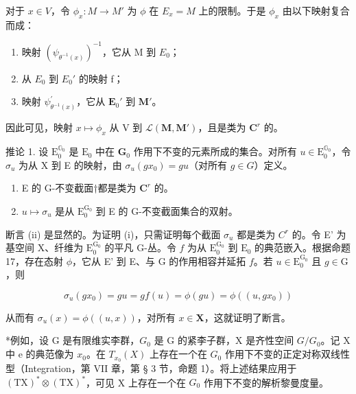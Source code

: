 对于 \(x \in V\)，令 \(\phi_x: M \to M'\) 为 \(\phi\) 在 \(E_x = M\) 上的限制。于是 \(\phi_x\) 由以下映射复合而成：

\begin{enumerate}
\def\labelenumi{(\arabic{enumi})}
\item
  映射 \((\psi_{\theta^{-1}(x)})^{-1}\)，它从 M 到 \(E_{0}\)；
\item
  从 \(E_{0}\) 到 \(E_{0}'\) 的映射 f；
\item
  映射 \(\psi_{\theta^{-1}(x)}^{\prime}\)，它从 \(\mathbf{E}_0'\) 到 \(\mathbf{M}'\)。
\end{enumerate}

因此可见，映射 \(x \mapsto \phi_x\) 从 V 到 \(\mathcal{L}(\mathbf{M}, \mathbf{M}')\)，且是类为 \(\mathbf{C}^r\) 的。

推论 1. 设 \(\mathrm{E}_0^{\mathbb{G}_0}\) 是 \(\mathrm{E}_0\) 中在 \(\mathbf{G}_0\) 作用下不变的元素所成的集合。对所有 \(u \in \mathrm{E}_0^{\mathbb{G}_0}\)，令 \(\sigma_u\) 为从 X 到 E 的映射，由 \(\sigma_u(gx_0) = gu\)（对所有 \(g \in G\)）定义。

\begin{enumerate}
\def\labelenumi{(\roman{enumi})}
\item
  E 的 G-不变截面†都是类为 \(\mathbf{C}^r\) 的。
\item
  \(u \mapsto \sigma_u\) 是从 \(\mathrm{E}_0^{\mathrm{G}_0}\) 到 E 的 G-不变截面集合的双射。
\end{enumerate}

断言 (ii) 是显然的。为证明 (i)，只需证明每个截面 \(\sigma_{u}\) 都是类为 \(C^r\) 的。令 E' 为基空间 X、纤维为 \(\mathrm{E}_0^{\mathrm{G}_0}\) 的平凡 G-丛。令 \(f\) 为从 \(\mathrm{E}_0^{\mathrm{G}_0}\) 到 \(\mathrm{E}_0\) 的典范嵌入。根据命题 17，存在态射 \(\phi\)，它从 E' 到 E、与 G 的作用相容并延拓 \(f\)。若 \(u \in \mathrm{E}_0^{\mathrm{G}_0}\) 且 \(g \in \mathrm{G}\)，则

\[
\sigma_ {u} (g x _ {0}) = g u = g f (u) = \phi (g u) = \phi ((u, g x _ {0}))
\]

从而有 \(\sigma_u(x) = \phi((u, x))\)，对所有 \(x \in \mathbf{X}\)，这就证明了断言。

*例如，设 G 是有限维实李群，\(G_{0}\) 是 G 的紧李子群，X 是齐性空间 \(G/G_{0}\)。记 X 中 e 的典范像为 \(x_{0}\)。在 \(T_{x_{0}}(X)\) 上存在一个在 \(G_{0}\) 作用下不变的正定对称双线性型（Integration，第 VII 章，第 § 3 节，命题 1）。将上述结果应用于 \((\mathrm{TX})^{*}\otimes(\mathrm{TX})^{*}\)，可见 X 上存在一个在 \(G_{0}\) 作用下不变的解析黎曼度量。

